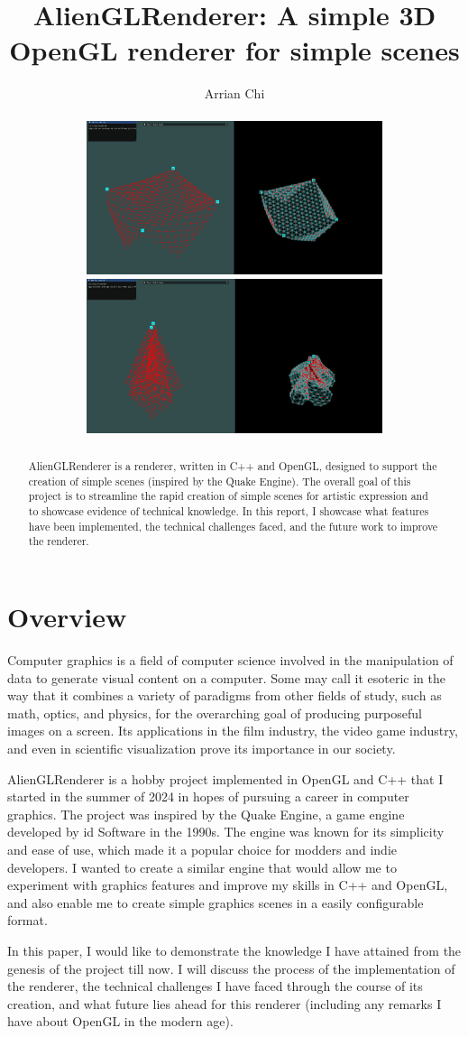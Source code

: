 \documentclass[letterpaper, 10 pt, conference]{ieeeconf}  %
\title{\LARGE \bf
AlienGLRenderer: A simple 3D OpenGL renderer for simple scenes
}
\author{Arrian Chi%
\\
\\ %
\includegraphics[width=8.7cm]{cloth1.PNG} \> \includegraphics[width=8.7cm]{cloth2.PNG} 
}
\begin{document}


\maketitle
\thispagestyle{empty}
\pagestyle{empty}



\begin{abstract}

AlienGLRenderer is a renderer, written in C++ and OpenGL, designed to support the creation of simple scenes (inspired by the Quake Engine). The overall goal of this project is to streamline the rapid creation of simple scenes for artistic expression and to showcase evidence of technical knowledge. In this report, I showcase what features have been implemented, the technical challenges faced, and the future work to improve the renderer. 

\end{abstract}
\section{Overview}
Computer graphics is a field of computer science involved in the manipulation of data to generate visual content on a computer. Some may call it esoteric in the way that it combines a variety of paradigms from other fields of study, such as math, optics, and physics, for the overarching goal of producing purposeful images on a screen. Its applications in the film industry, the video game industry, and even in scientific visualization prove its importance in our society. 

AlienGLRenderer is a hobby project implemented in OpenGL and C++ that I started in the summer of 2024 in hopes of pursuing a career in computer graphics. The project was inspired by the Quake Engine, a game engine developed by id Software in the 1990s. The engine was known for its simplicity and ease of use, which made it a popular choice for modders and indie developers. I wanted to create a similar engine that would allow me to experiment with graphics features and improve my skills in C++ and OpenGL, and also enable me to create simple graphics scenes in a easily configurable format.

In this paper, I would like to demonstrate the knowledge I have attained from the genesis of the project till now. I will discuss the process of the implementation of the renderer, the technical challenges I have faced through the course of its creation, and what future lies ahead for this renderer (including any remarks I have about OpenGL in the modern age).
\end{document}
